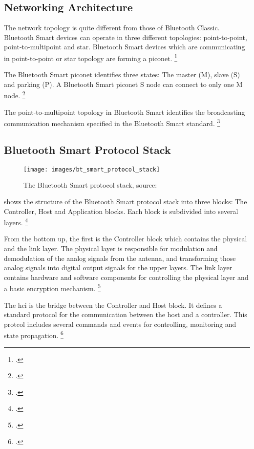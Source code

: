 \subsection{Networking Architecture}

The network topology is quite different from those of Bluetooth Classic. Bluetooth Smart devices can operate in three different topologies: point-to-point, point-to-multipoint and star. Bluetooth Smart devices which are communicating in point-to-point or star topology are forming a piconet. \footcite[Cf.][77-78]{Gratton2013}

The Bluetooth Smart piconet identifies three states: The master (M), slave (S) and parking (P). A Bluetooth Smart piconet S node can connect to only one M node. \footcite[Cf.][77-78]{Gratton2013}

The point-to-multipoint topology in Bluetooth Smart identifies the broadcasting communication mechanism specified in the Bluetooth Smart standard. \footcite[Cf.][9]{Townsend2014}

\subsection{Bluetooth Smart Protocol Stack}

\begin{figure}[ht]
  \centering
  \texttt{[image: images/bt\_smart\_protocol\_stack]}
  \caption{The Bluetooth Smart protocol stack, source: \cite[16]{Townsend2014}}
  \label{fig:bt_smart_protocol_stack}
\end{figure}

 shows the structure of the Bluetooth Smart protocol stack into three blocks: The Controller, Host and Application blocks. Each block is subdivided into several layers. \footcite[Cf.][15]{Townsend2014}

From the bottom up, the first is the Controller block which contains the physical and the link layer. The physical layer is responsible for modulation and demodulation of the analog signals from the antenna, and transforming those analog signals into digital output signals for the upper layers. The link layer contains hardware and software components for controlling the physical layer and a basic encryption mechanism.  \footcite[Cf.][16-18]{Townsend2014}

The \gls{hci} is the bridge between the Controller and Host block. It defines a standard protocol for the communication between the host and a controller. This protcol includes several commands and events for controlling, monitoring and state propagation. \footcite[Cf.][24-25]{Townsend2014}


